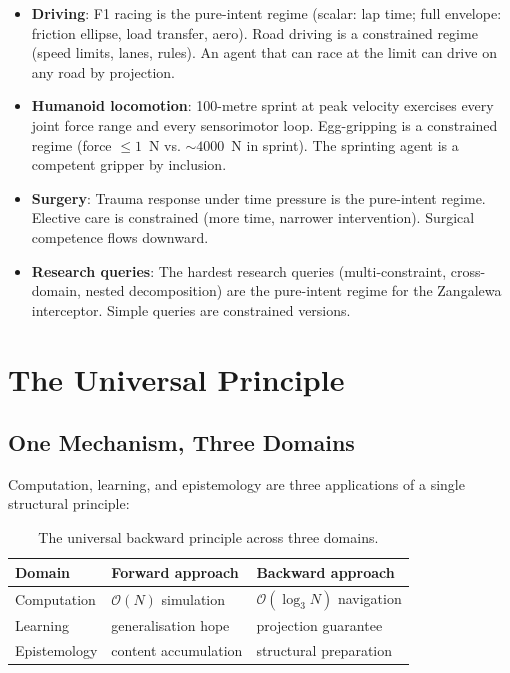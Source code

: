 \documentclass[twocolumn,11pt,a4paper]{article}
\begin{document}
\begin{itemize}[leftmargin=*,itemsep=2pt]
\item \textbf{Driving}: F1 racing is the pure-intent regime (scalar: lap time; full envelope: friction ellipse, load transfer, aero). Road driving is a constrained regime (speed limits, lanes, rules). An agent that can race at the limit can drive on any road by projection.
\item \textbf{Humanoid locomotion}: 100-metre sprint at peak velocity exercises every joint force range and every sensorimotor loop. Egg-gripping is a constrained regime (force $\leq 1$~N vs. $\sim 4000$~N in sprint). The sprinting agent is a competent gripper by inclusion.
\item \textbf{Surgery}: Trauma response under time pressure is the pure-intent regime. Elective care is constrained (more time, narrower intervention). Surgical competence flows downward.
\item \textbf{Research queries}: The hardest research queries (multi-constraint, cross-domain, nested decomposition) are the pure-intent regime for the Zangalewa interceptor. Simple queries are constrained versions.
\end{itemize}


\section{The Universal Principle}
\label{sec:universal_principle}

\subsection{One Mechanism, Three Domains}

Computation, learning, and epistemology are three applications of a single structural principle:

\begin{table}[!htbp]
\centering
\caption{The universal backward principle across three domains.}
\begin{tabular}{lll}
\toprule
Domain & Forward approach & Backward approach \\
\midrule
Computation  & $\mathcal{O}(N)$ simulation        & $\mathcal{O}(\log_3 N)$ navigation \\
Learning     & generalisation hope                 & projection guarantee \\
Epistemology & content accumulation                & structural preparation \\
\bottomrule
\end{tabular}
\end{table}
\end{document}
